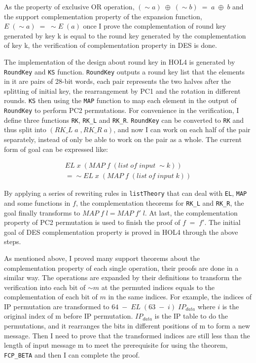 \documentclass{article}
\begin{document}
As the property of exclusive OR operation, $(\sim a) \; \oplus \; (\sim  b) \;= \;a \; \oplus \; b$ and the support
complementation property of the expansion function, $E \; (\sim a) \;= \; \sim  E \; (a)$ once I prove the complementation of
round key generated by key k is equal to the round key generated by the complementation of key k, the verification of complementation property
in DES is done.

The implementation of the design about round key in HOL4 is generated by \verb|RoundKey| and \verb|KS| function. \verb|RoundKey| outputs a
round key list that the elements in it
are pairs of 28-bit words, each pair represents the two halves after the splitting of initial key, the rearrangement by PC1
and the rotation in different rounds. \verb|KS| then using the \verb|MAP| function to map each element in the output of \verb|RoundKey| to
perform PC2 permutations. For convenience in the verification, I define three functions \verb|RK|, \verb|RK_L| and \verb|RK_R|.
\verb|RoundKey| can be converted to \verb|RK| and thus split into $(RK\_L \; a \;,RK\_R \; a)$, and now I can work on each half of the pair
separately, instead of only be able to work on the pair as a whole. The current form of goal can be expressed like:

\begin{multline*}
EL \; x \; (MAP \; f \; (list \; of \; input \; \sim k))\\
= \sim EL \; x \; (MAP \; f \; (list \; of \; input \; k))
\end{multline*}

By applying a series of rewriting rules in \verb|listTheory| that can deal with \verb|EL|, \verb|MAP| and some functions in $f$, the complementation
theorems for \verb|RK_L| and \verb|RK_R|, the goal finally transforms to $MAP\; f \;l = MAP\; f'\; l$. At last, the complementation property of PC2
permutation is used
to finish the proof of $f\;=\;f'$. The initial goal of DES complementation property is proved in HOL4 through the above steps.

As mentioned above, I proved many support theorems about the complementation property of each single operation, their proofs are
done in a similar way. The operations are expanded by their definitions to transform the verification into each bit of $\sim m$
at the permuted indices equals to the complementation of each bit of $m$ in the same indices. For example, the indices of IP
permutation are transformed to $64 \; - \; EL \; (63 \;-\;i) \; IP_{data}$ where $i$ is the original index of m before IP
permutation. $IP_{data}$ is the IP table to do the permutations, and it rearranges the bits in different positions of m
to form a new message. Then I need to prove that the transformed indices are still less than the length of input message m to
meet the prerequisite for using the theorem, \verb|FCP_BETA| and then I can complete the proof.
\end{document}
